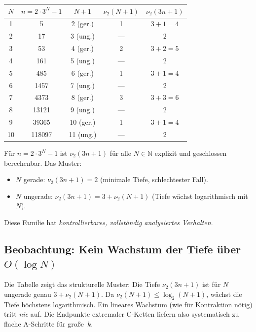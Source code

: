 \documentclass[12pt,a4paper]{article}
\newcommand{\vii}{\nu_2}
\newcommand{\N}{\mathbb{N}}
\begin{document}
\begin{center}
\renewcommand{\arraystretch}{1.4}
\begin{tabular}{ccccc}
\toprule
$N$ & $n = 2\cdot 3^N - 1$ & $N+1$ & $\vii(N+1)$ & $\vii(3n+1)$ \\
\midrule
1  & 5           & 2 (ger.)  & 1 & $3+1 = 4$ \\
2  & 17          & 3 (ung.)  & — & $2$ \\
3  & 53          & 4 (ger.)  & 2 & $3+2 = 5$ \\
4  & 161         & 5 (ung.)  & — & $2$ \\
5  & 485         & 6 (ger.)  & 1 & $3+1 = 4$ \\
6  & 1457        & 7 (ung.)  & — & $2$ \\
7  & 4373        & 8 (ger.)  & 3 & $3+3 = 6$ \\
8  & 13121       & 9 (ung.)  & — & $2$ \\
9  & 39365       & 10 (ger.) & 1 & $3+1 = 4$ \\
10 & 118097      & 11 (ung.) & — & $2$ \\
\bottomrule
\end{tabular}
\end{center}

\begin{tcolorbox}[ergebnis, title={Vollständige Klassifikation}]
Für $n = 2\cdot 3^N - 1$ ist $\vii(3n+1)$ für alle $N \in \N$ explizit
und geschlossen berechenbar. Das Muster:
\begin{itemize}
  \item $N$ gerade: $\vii(3n+1) = 2$ (minimale Tiefe, schlechtester Fall).
  \item $N$ ungerade: $\vii(3n+1) = 3 + \vii(N+1)$
    (Tiefe wächst logarithmisch mit $N$).
\end{itemize}
Diese Familie hat \emph{kontrollierbares, vollständig analysiertes Verhalten}.
\end{tcolorbox}

\subsection{Beobachtung: Kein Wachstum der Tiefe über $O(\log N)$}

Die Tabelle zeigt das strukturelle Muster: Die Tiefe $\vii(3n+1)$ ist für
$N$ ungerade genau $3 + \vii(N+1)$. Da $\vii(N+1) \leq \log_2(N+1)$, wächst
die Tiefe höchstens logarithmisch. Ein lineares Wachstum (wie für Kontraktion
nötig) tritt \emph{nie} auf. Die Endpunkte extremaler C-Ketten liefern also
systematisch zu flache A-Schritte für große~$k$.
\end{document}
